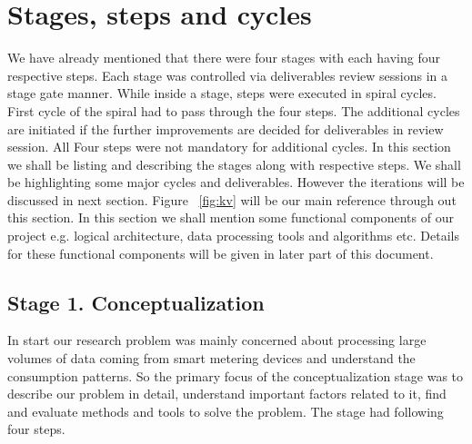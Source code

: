 \section{Stages, steps and cycles}\label{stages} 
We have already mentioned that there were four stages with each having four respective steps. Each stage was controlled via deliverables review sessions in a stage gate manner. While inside a stage, steps were executed in spiral cycles. First cycle of the spiral had to pass through the four steps. The additional cycles are initiated if the further improvements are decided for deliverables in review session. All Four steps were not mandatory for additional cycles. In this section we shall be listing and describing the stages along with respective steps. We shall be highlighting some major cycles and deliverables. However the iterations will be discussed in next section. Figure ~\ref{fig:kv} will be our main reference through out this section. In this section we shall mention some functional components of our project e.g. logical architecture, data processing tools and algorithms etc. Details for these functional components will be given in later part of this document.
\subsection{Stage 1. Conceptualization } \label{concept}
In start our research problem was mainly concerned about processing large volumes of data coming from smart metering devices and understand the consumption patterns. So the primary focus of the conceptualization stage was to describe our problem in detail, understand important factors related to it, find and evaluate methods and tools to solve the problem. The stage had following four steps.
